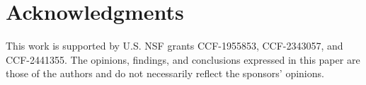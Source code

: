 
\section*{Acknowledgments}
This work is supported by U.S. NSF grants CCF-1955853, CCF-2343057, and CCF-2441355. The opinions, findings, and conclusions expressed in this paper are those of the authors and do not necessarily reflect the sponsors' opinions.


